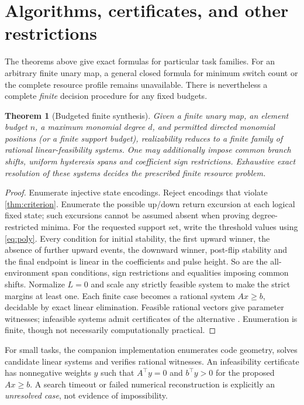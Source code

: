 \documentclass[12pt,letterpaper]{article}
\newtheorem{theorem}{Theorem}[section]
\theoremstyle{definition}\newtheorem{definition}[theorem]{Definition}
\theoremstyle{remark}\newtheorem{remark}[theorem]{Remark}
\begin{document}
\section{Algorithms, certificates, and other restrictions}\label{sec:algorithm}
The theorems above give exact formulas for particular task families. For an arbitrary finite unary map, a general closed formula for minimum switch count or the complete resource profile remains unavailable. There is nevertheless a complete \emph{finite} decision procedure for any fixed budgets.

\begin{theorem}[Budgeted finite synthesis]\label{thm:synthesis}
Given a finite unary map, an element budget $n$, a maximum monomial degree $d$, and permitted directed monomial positions (or a finite support budget), realizability reduces to a finite family of rational linear-feasibility systems. One may additionally impose common branch shifts, uniform hysteresis spans and coefficient sign restrictions. Exhaustive exact resolution of these systems decides the prescribed finite resource problem.
\end{theorem}
\begin{proof}
Enumerate injective state encodings. Reject encodings that violate \cref{thm:criterion}. Enumerate the possible up/down return excursion at each logical fixed state; such excursions cannot be assumed absent when proving degree-restricted minima. For the requested support set, write the threshold values using \eqref{eq:poly}. Every condition for initial stability, the first upward winner, the absence of further upward events, the downward winner, post-flip stability and the final endpoint is linear in the coefficients and pulse height. So are the all-environment span conditions, sign restrictions and equalities imposing common shifts. Normalize $L=0$ and scale any strictly feasible system to make the strict margins at least one. Each finite case becomes a rational system $Ax\ge b$, decidable by exact linear elimination. Feasible rational vectors give parameter witnesses; infeasible systems admit certificates of the alternative \citep{farkas1902}. Enumeration is finite, though not necessarily computationally practical.
\end{proof}

For small tasks, the companion implementation enumerates code geometry, solves candidate linear systems and verifies rational witnesses. An infeasibility certificate has nonnegative weights $y$ such that $A^\top y=0$ and $b^\top y>0$ for the proposed $Ax\ge b$. A search timeout or failed numerical reconstruction is explicitly an \emph{unresolved case}, not evidence of impossibility.
\end{document}
